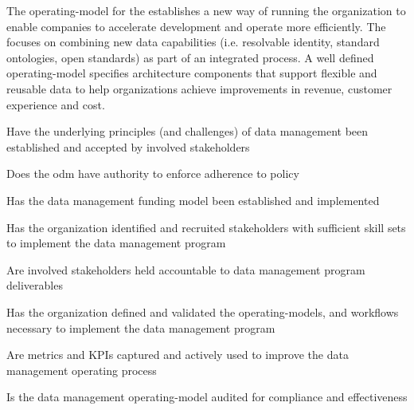 %
%

\ekgmmContextSection

The \gls{operating-model} for the  establishes a new way of running the organization
to enable companies to accelerate development and operate more efficiently.
The   focuses on
combining new data capabilities (i.e. resolvable identity, standard ontologies, open standards)
as part of an integrated process.
A well defined \gls{operating-model} specifies architecture components that support flexible and reusable data to help
organizations achieve improvements in revenue, customer experience and cost.

\ekgmmcorequestionssection

\begin{core-questions}

  \item [\thesection.1] Have the underlying principles (and challenges) of data management been established and
                        accepted by involved stakeholders
  \item [\thesection.2] Does the \gls{odm} have authority to enforce adherence to policy
  \item [\thesection.3] Has the data management funding model been established and implemented
  \item [\thesection.4] Has the organization identified and recruited stakeholders with sufficient skill sets to
                        implement the data management program
  \item [\thesection.5] Are involved stakeholders held accountable to data management program deliverables
  \item [\thesection.6] Has the organization defined and validated the \glspl{operating-model},
                        and workflows necessary to implement the data management program
  \item [\thesection.7] Are metrics and KPIs captured and actively used to improve the data management operating process
  \item [\thesection.8] Is the data management \gls{operating-model} audited for compliance and effectiveness

\end{core-questions}

